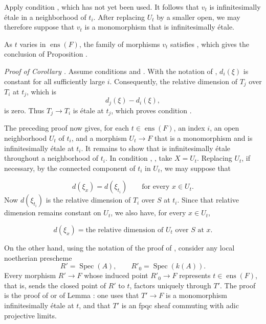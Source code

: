 Apply condition , which has not yet been used.  It follows that
\(v_t\) is infinitesimally étale in a neighborhood of \(t_i\).
After replacing \(U_t\) by a smaller open, we may therefore suppose
that \(v_t\) is a monomorphism that is infinitesimally étale.

As \(t\) varies in \(\operatorname{ens}(F)\), the family of morphisms
\(v_t\) satisfies , which gives the conclusion of
Proposition .

\smallskip
\noindent\emph{Proof of Corollary
.}
Assume conditions  and .  With the notation of
, \(d_i(\xi)\) is constant for all sufficiently large \(i\).
Consequently, the relative dimension of \(T_j\) over \(T_i\) at
\(t_j\), which is
\[
  d_j(\xi)-d_i(\xi),
\]
is zero.  Thus \(T_j\to T_i\) is étale at \(t_j\), which proves
condition .

The preceding proof now gives, for each
\(t\in\operatorname{ens}(F)\), an index \(i\), an open neighborhood
\(U_t\) of \(t_i\), and a morphism \(U_t\to F\) that is a
monomorphism and is infinitesimally étale at \(t_i\).  It remains to
show that  is infinitesimally étale throughout a
neighborhood of \(t_i\).  In condition , , take
\(X=U_t\).  Replacing \(U_t\), if necessary, by the connected
component of \(t_i\) in \(U_t\), we may suppose that

\[
  d(\xi_x)=d(\xi_{t_i})
  \qquad\text{for every }x\in U_t.
\]
Now \(d(\xi_{t_i})\) is the relative dimension of \(T_i\) over \(S\)
at \(t_i\).  Since that relative dimension remains constant on
\(U_t\), we also have, for every \(x\in U_t\),

\[
  \tag{*}
  d(\xi_x)=\text{the relative dimension of \(U_t\) over \(S\) at \(x\)}.
\]

On the other hand, using the notation of the proof of
, consider any local
noetherian prescheme
\[
  R'=\operatorname{Spec}(A),
  \qquad
  R'_0=\operatorname{Spec}(k(A)).
\]
Every morphism \(R'\to F\) whose induced point \(R'_0\to F\)
represents \(t\in\operatorname{ens}(F)\), that is, sends the closed
point of \(R'\) to \(t\), factors uniquely through \(T'\).  The proof
is the proof of  or of Lemma
: one uses that \(T'\to F\) is a
monomorphism infinitesimally étale at \(t\), and that \(T'\) is an
fpqc sheaf commuting with adic projective limits.

